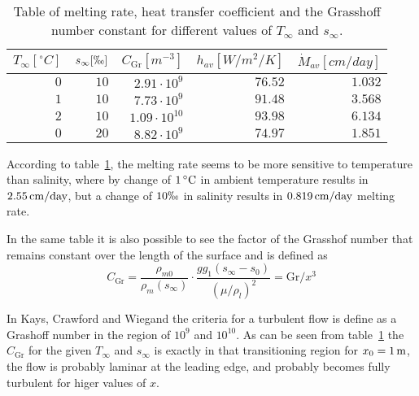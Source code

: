 	\begin{table}
	  \centering
	  \begin{tabular}{rrrrr}
	    $T_\infty [\unit{^\circ C}]$ & $s_\infty [\permil]$ & $C_{\text{Gr}} [\unit{m^{-3}}]$ & $h_{av} [\unit{W/m^2/K}]$ & $\dot{M}_{av} [\unit{cm/day}]$ \\
	    \hline
	    $0$ & $10$ & $2.91\cdot10^{9}$ & $76.52$ & $1.032$ \\
	    $1$ & $10$ & $7.73\cdot10^{9}$ & $91.48$ & $3.568$ \\
	    $2$ & $10$ & $1.09\cdot10^{10}$ & $93.98$ & $6.134$ \\
	    $0$ & $20$ & $8.82\cdot10^{9}$ & $74.97$ & $1.851$ \\
	    \hline
	  \end{tabular}
	  \caption{Table of melting rate, heat transfer coefficient and the Grasshoff number constant for different values of $T_\infty$ and $s_\infty$.}
	  \label{tab:thermRes}
	\end{table}

	According to table~\ref{tab:thermRes}, the melting rate seems to be more sensitive to temperature than salinity, where by change of $ \unit[1]{^\circ C}$ in ambient temperature results in $\unit[2.55]{cm/day}$, but a change of $10 \permil$ in salinity results in $\unit[0.819]{cm/day}$ melting rate.

	In the same table it is also possible to see the factor of the Grasshof number that remains constant over the length of the surface and is defined as
	\begin{equation*}
	  C_{\text{Gr}}= \frac{\rho_{m0}}{\rho_{m}(s_{\infty})}\cdot \frac{g g_1 (s_{\infty}-s_0)}{(\mu/\rho_l)^2} = \text{Gr}/x^3
	\end{equation*}

	In Kays, Crawford and Wiegand the criteria for a turbulent flow is define as a Grashoff number in the region of $10^9$ and $10^10$. As can be seen from table~\ref{tab:thermRes} the $C_{\text{Gr}}$ for the given $T_{\infty}$ and $s_{\infty}$ is exactly in that transitioning region for $x_0=\unit[1]{m}$, the flow is probably laminar at the leading edge, and probably becomes fully turbulent for higer values of $x$.




